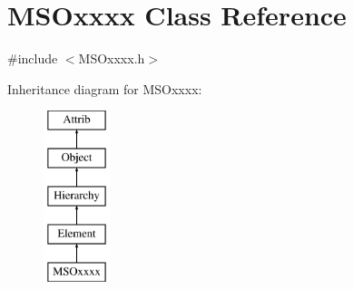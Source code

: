 \hypertarget{classMSOxxxx}{}\section{M\+S\+Oxxxx Class Reference}
\label{classMSOxxxx}


{\ttfamily \#include $<$M\+S\+Oxxxx.\+h$>$}

Inheritance diagram for M\+S\+Oxxxx\+:\begin{figure}[H]
\begin{center}
\leavevmode
\includegraphics[height=5.000000cm]{classMSOxxxx}
\end{center}
\end{figure}
